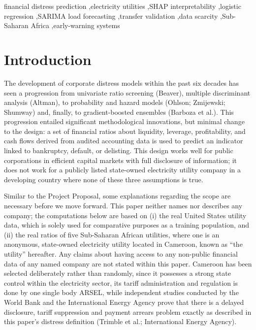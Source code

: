 \documentclass[final,1p,times]{elsarticle}
\begin{document}
\begin{frontmatter}
\begin{abstract}
previous failure. The three different signals -- a transferred ratio predictor, a true revenue-leakage proxy, and a true consumption forecast divergence rate -- all independently converge on the onset time for the utility's crisis and the fact that the situation deteriorated after that point.
\end{abstract}

\begin{keyword}
financial distress prediction \sep electricity utilities \sep SHAP interpretability \sep logistic regression \sep SARIMA load forecasting \sep transfer validation \sep data scarcity \sep Sub-Saharan Africa \sep early-warning systems
\end{keyword}

\end{frontmatter}

\section{Introduction}
\label{S:intro}

The development of corporate distress models within the past six decades has seen a progression from univariate ratio screening (Beaver), multiple discriminant analysis (Altman), to probability and hazard models (Ohlson; Zmijewski; Shumway) and, finally, to gradient-boosted ensembles (Barboza et al.). This progression entailed significant methodological innovations, but minimal change to the design: a set of financial ratios about liquidity, leverage, profitability, and cash flows derived from audited accounting data is used to predict an indicator linked to bankruptcy, default, or delisting. This design works well for public corporations in efficient capital markets with full disclosure of information; it does not work for a publicly listed state-owned electricity utility company in a developing country where none of these three assumptions is true.

Similar to the Project Proposal, some explanations regarding the scope are necessary before we move forward. This paper neither names nor describes any company; the computations below are based on (i) the real United States utility data, which is solely used for comparative purposes as a training population, and (ii) the real ratios of five Sub-Saharan African utilities, where one is an anonymous, state-owned electricity utility located in Cameroon, known as ``the utility'' hereafter. Any claims about having access to any non-public financial data of any named company are not stated within this paper. Cameroon has been selected deliberately rather than randomly, since it possesses a strong state control within the electricity sector, its tariff administration and regulation is done by one single body ARSEL, while independent studies conducted by the World Bank and the International Energy Agency prove that there is a delayed disclosure, tariff suppression and payment arrears problem exactly as described in this paper's distress definition (Trimble et al.; International Energy Agency).
\end{document}
